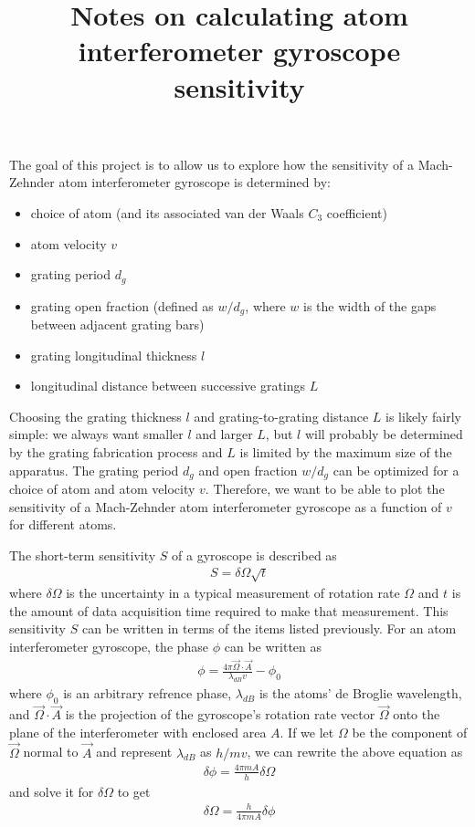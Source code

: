 \documentclass[twocolumn,pra,showpacs,superscriptaddress,longbibliography]{revtex4-1}   %
\begin{document}
\title{Notes on calculating atom interferometer gyroscope sensitivity}
\maketitle


The goal of this project is to allow us to explore how the sensitivity of a Mach-Zehnder atom interferometer gyroscope is determined by:
\begin{itemize}
	\item choice of atom (and its associated van der Waals $C_3$ coefficient)
	\item atom velocity $v$
	\item grating period $d_g$
	\item grating open fraction (defined as $w/d_g$, where $w$ is the width of the gaps between adjacent grating bars)
	\item grating longitudinal thickness $l$
	\item longitudinal distance between successive gratings $L$
\end{itemize}
Choosing the grating thickness $l$ and grating-to-grating distance $L$ is likely fairly simple: we always want smaller $l$ and larger $L$, but $l$ will probably be determined by the grating fabrication process and $L$ is limited by the maximum size of the apparatus. The grating period $d_g$ and open fraction $w/d_g$ can be optimized for a choice of atom and atom velocity $v$. Therefore, we want to be able to plot the sensitivity of a Mach-Zehnder atom interferometer gyroscope as a function of $v$ for different atoms.


The short-term sensitivity $S$ of a gyroscope is described as 
\begin{align}
	S = \delta\Omega \sqrt{t}
	\label{sensitivityGeneral}
\end{align}
where $\delta\Omega$ is the uncertainty in a typical measurement of rotation rate $\Omega$ and $t$ is the amount of data acquisition time required to make that measurement.
This sensitivity $S$ can be written in terms of the items listed previously.
For an atom interferometer gyroscope, the phase $\phi$ can be written as
\begin{align}
	\phi = \frac{4\pi\vec{\Omega}\cdot\vec{A}}{\lambda_{dB} v} - \phi_0
\end{align}
where $\phi_0$ is an arbitrary refrence phase, $\lambda_{dB}$ is the atoms' de Broglie wavelength, and $\vec{\Omega}\cdot\vec{A}$ is the projection of the gyroscope's rotation rate vector $\vec{\Omega}$ onto the plane of the interferometer with enclosed area $A$. If we let $\Omega$ be the component of $\vec{\Omega}$ normal to $\vec{A}$ and represent $\lambda_{dB}$ as $h/mv$, we can rewrite the above equation as
\begin{align}
	\delta\phi = \frac{4\pi m A}{h}\delta\Omega
\end{align}
and solve it for $\delta\Omega$ to get
\begin{align}
	\delta\Omega = \frac{h}{4\pi m A}\delta\phi
	\label{deltaOmega}
\end{align}
\end{document}
